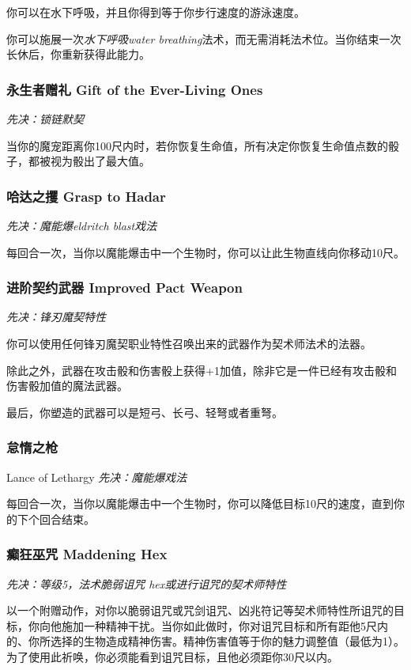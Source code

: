 你可以在水下呼吸，并且你得到等于你步行速度的游泳速度。

你可以施展一次\emph{水下呼吸water breathing}法术，而无需消耗法术位。当你结束一次长休后，你重新获得此能力。

\subsubsection{永生者赠礼 Gift of the Ever-Living Ones}
\emph{先决：锁链默契}

当你的魔宠距离你100尺内时，若你恢复生命值，所有决定你恢复生命值点数的骰子，都被视为骰出了最大值。

\subsubsection{哈达之攫 Grasp to Hadar}
\emph{先决：魔能爆eldritch blast戏法}

每回合一次，当你以魔能爆击中一个生物时，你可以让此生物直线向你移动10尺。

\subsubsection{进阶契约武器 Improved Pact Weapon}
\emph{先决：锋刃魔契特性}

你可以使用任何锋刃魔契职业特性召唤出来的武器作为契术师法术的法器。

除此之外，武器在攻击骰和伤害骰上获得+1加值，除非它是一件已经有攻击骰和伤害骰加值的魔法武器。

最后，你塑造的武器可以是短弓、长弓、轻弩或者重弩。

\subsubsection{怠惰之枪 }Lance of Lethargy
\emph{先决：魔能爆戏法}

每回合一次，当你以魔能爆击中一个生物时，你可以降低目标10尺的速度，直到你的下个回合结束。

\subsubsection{癫狂巫咒 Maddening Hex}
\emph{先决：等级5，法术脆弱诅咒 hex或进行诅咒的契术师特性}

以一个附赠动作，对你以脆弱诅咒或咒剑诅咒、凶兆符记等契术师特性所诅咒的目标，你向他施加一种精神干扰。当你如此做时，你对诅咒目标和所有距他5尺内的、你所选择的生物造成精神伤害。精神伤害值等于你的魅力调整值（最低为1）。为了使用此祈唤，你必须能看到诅咒目标，且他必须距你30尺以内。

